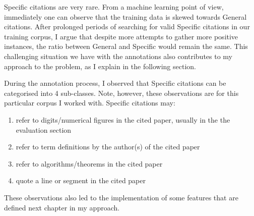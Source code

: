 Specific citations are very rare. From a machine learning point of view, immediately one can observe that the training data is skewed towards General citations. After prolonged periods of searching for valid Specific citations in our training corpus, I argue that despite more attempts to gather more positive instances, the ratio between General and Specific would remain the same. This challenging situation we have with the annotations also contributes to my approach to the problem, as I explain in the following section.

During the annotation process, I observed that Specific citations can be categorised into 4 sub-classes. Note, however, these observations are for this particular corpus I worked with. Specific citations may:
\begin{enumerate}
\item refer to digits/numerical figures in the cited paper, usually in the the evaluation section
\item refer to term definitions by the author(s) of the cited paper
\item refer to algorithms/theorems in the cited paper
\item quote a line or segment in the cited paper
\end{enumerate}
These observations also led to the implementation of some features that are defined next chapter in my approach.